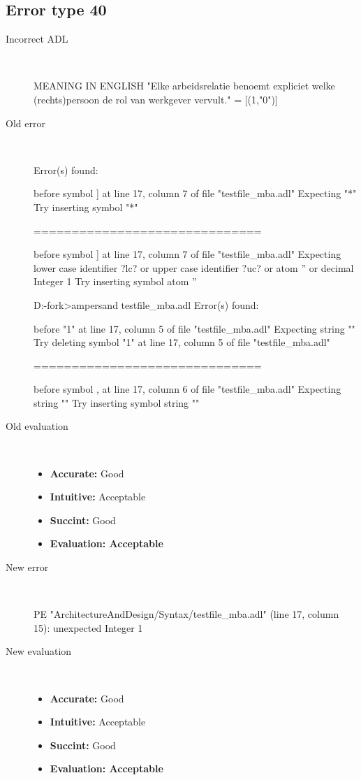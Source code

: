 \hrulefill

\subsection{Error type 40}
  \begin{description}
  \item[Incorrect ADL]~\\
\begin{adl}
MEANING IN ENGLISH "Elke arbeidsrelatie benoemt expliciet welke (rechts)persoon de rol van werkgever vervult."
= [(1,"0")]\end{adl}
  \item[Old error]~\\
\begin{haskell}
Error(s) found:

before symbol ] at line 17, column 7 of file "testfile_mba.adl"
Expecting "*"
Try inserting symbol "*"

==============================

before symbol ] at line 17, column 7 of file "testfile_mba.adl"
Expecting lower case identifier ?lc? or upper case identifier ?uc? or atom '' or
 decimal Integer 1
Try inserting symbol atom ''


D:\ampersand-fork\ArchitectureAndDesign\Syntax>ampersand testfile_mba.adl
Error(s) found:

before "1" at line 17, column 5 of file "testfile_mba.adl"
Expecting string ""
Try deleting symbol "1" at line 17, column 5 of file "testfile_mba.adl"

==============================

before symbol , at line 17, column 6 of file "testfile_mba.adl"
Expecting string ""
Try inserting symbol string ""
\end{haskell}
  \item[Old evaluation]~\\
    \begin{itemize}
    \item \textbf{Accurate:} Good
    \item \textbf{Intuitive:} Acceptable
    \item \textbf{Succint:} Good
    \item \textbf{Evaluation: Acceptable}
    \end{itemize}
  \item[New error]~\\
\begin{haskell}
PE "ArchitectureAndDesign/Syntax/testfile_mba.adl" (line 17, column 15):
unexpected Integer 1\end{haskell}
  \item[New evaluation]~\\
    \begin{itemize}
    \item \textbf{Accurate:} Good
    \item \textbf{Intuitive:} Acceptable
    \item \textbf{Succint:} Good
    \item \textbf{Evaluation: Acceptable
}
    \end{itemize}
  \end{description}

